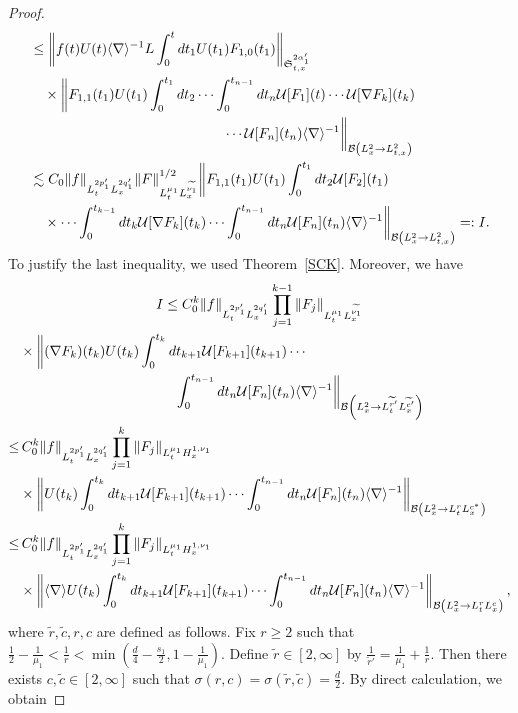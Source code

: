 \documentclass[10pt,a4paper]{amsart}
\providecommand{\No}[1]{\left\| #1 \right\|}
\newcommand{\CB}{\mathcal{B}}
\newcommand{\CU}{\mathcal{U}}
\newcommand{\FS}{\mathfrak{S}}
\newcommand{\al}{\alpha}
\newcommand{\si}{\sigma}
\newcommand{\wt}{\widetilde}
\renewcommand{\No}[1]{\left\| #1 \right\|}
\newcommand{\I}{\infty}
\newcommand{\sd}{\langle \nabla \rangle}
\newcommand{\sdi}{\sd^{-1}}
\newcommand{\tx}{{t,x}}
\newcommand{\tw}{\frac{1}{2}}
\newcommand{\na}{\nabla}
\newcommand{\ls}{\lesssim}
\begin{document}
\begin{proof}
\begin{align}
& \le \No{f(t)U(t)\sdi L \int_0^t dt_1 U(t_1)F_{1,0}(t_1)}_{\FS^{2\al_1'}_\tx} \nonumber\\
&\quad \times \bigg\| F_{1,1}(t_1)U(t_1)\int_0^{t_1} dt_2 \cdots \int_0^{t_{n-1}} dt_n
\CU[F_1](t) \cdots \CU[\na F_k](t_k)\nonumber\\
&\mkern250mu \cdots \CU[F_n](t_n) \sdi \bigg\|_{\CB\left(L^2_x \to L^2_\tx\right)} \nonumber\\
&\ls C_0
\|f\|_{L^{2p_1'}_t L^{2q_1'}_x}
\|F\|_{L^{\mu_1}_t L^{\wt{\nu_1}}_x}^{1/2} \bigg\| F_{1,1}(t_1)U(t_1)
\int_0^{t_1} dt_2 \CU[F_2](t_1)\nonumber\\
&\quad \times
\cdots
\int_0^{t_{k-1}} dt_k \CU[\na F_k](t_k)
\cdots
\int_0^{t_{n-1}} dt_n \CU[F_n](t_n) \sdi\bigg\|_{\CB\left(L^2_x \to L^2_\tx\right)} =: I.\nonumber
\end{align}
\endgroup
To justify the last inequality, we used Theorem~\ref{SCK}. Moreover, we have
\begin{multline}
I \le C_0^k
\|f\|_{L^{2p_1'}_t L^{2q_1'}_x}
\prod_{j=1}^{k-1}\|F_j\|_{L^{\mu_1}_t L^{\wt{\nu_1}}_x}\\
\begin{aligned}
&\times
\bigg\| (\na F_k)(t_k) U(t_k)
\int_0^{t_k}dt_{k+1} \CU[F_{k+1}](t_{k+1})
\cdots\\
&\mkern200mu\int_0^{t_{n-1}} dt_n \CU[F_n](t_n) \sdi \bigg\|_{\CB\left(L^2_x \to L^{\wt{r}'}_t L^{\wt{c}'}_x\right)} \\
\le&\, C_0^k \|f\|_{L^{2p_1'}_t L^{2q_1'}_x}
\prod_{j=1}^k \|F_j\|_{L^{\mu_1}_t H^{1,\nu_1}_x}\\
&\times
\No{ U(t_k)
\int_0^{t_k}dt_{k+1} \CU[F_{k+1}](t_{k+1})
\cdots
\int_0^{t_{n-1}} dt_n \CU[F_n](t_n) \sdi }_{\CB\left(L^2_x \to L^r_t L^{c^*}_x\right)} \\
\le&\, C_0^k \|f\|_{L^{2p_1'}_t L^{2q_1'}_x}
\prod_{j=1}^k \|F_j\|_{L^{\mu_1}_t H^{1,\nu_1}_x}\\
&\times
\No{
\sd U(t_k)
\int_0^{t_k}dt_{k+1} \CU[F_{k+1}](t_{k+1})
\cdots
\int_0^{t_{n-1}} dt_n \CU[F_n](t_n) \sdi }_{\CB\left(L^2_x \to L^r_t L^c_x\right)},
\end{aligned}
\end{multline}
where $\wt{r},\wt{c},r,c$ are defined as follows. Fix $r \ge 2$ such that $\tw-\frac{1}{\mu_1} < \frac{1}{r} < \min(\frac{d}{4}-\frac{s_1}{2}, 1-\frac{1}{\mu_1})$. Define $\wt{r} \in [2,\I]$ by $\frac{1}{\wt{r}'}=\frac{1}{\mu_1}+\frac{1}{r}$. Then there exists $c,\wt{c} \in [2,\I]$ such that $\si(r,c) = \si(\wt{r},\wt{c}) = \frac{d}{2}$. By direct calculation, we obtain

\end{proof}
\end{document}
